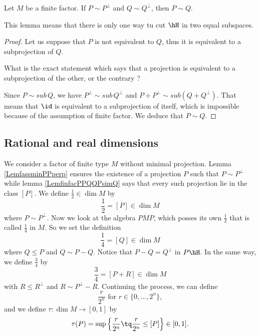 \begin{lemma}		\label{LemfinfacPPQQPsimQ}
Let $M$ be a finite factor. If $P\sim P^{\perp}$ and $Q\sim Q^{\perp}$, then $P\sim Q$.
\end{lemma}

This lemma means that there is only one way tu cut $\hH$ in two equal subspaces.

\begin{proof}
Let us suppose that $P$ is not equivalent to $Q$, thus it is equivalent to a subprojection of $Q$.

\begin{probleme}
What is the exact statement which says that a projection is equivalent to a subprojection of the other, or the contrary ?
\end{probleme}

Since $P\sim sub\, Q$, we have $P^{\perp}\sim sub\, Q^{\perp}$ and $P+P^{\perp}\sim sub(Q+Q^{\perp})$. That means that $\id$ is equivalent to a subprojection of itself, which is impossible because of the assumption of finite factor. We deduce that $P\sim Q$.
\end{proof}

					\subsection{Rational and real dimensions}
\label{SubSecRationalRealDim}

We consider a factor of finite type $M$ without minimal projection. Lemma \ref{LemfassminPPperp} ensures the existence of a projection $P$ such that $P\sim P^{\perp}$ while lemma \ref{LemfinfacPPQQPsimQ} says that every such projection lie in the class $[P]$. We define $\frac{ 1 }{2}\in\dim M$ by
\begin{equation}
\frac{ 1 }{2}=[P]\in\dim M
\end{equation}
where $P\sim P^{\perp}$. Now we look at the algebra $PMP$, which posses its own $\frac{ 1 }{2}$ that is called $\frac{1}{ 4 }$ in $M$. So we set the definition
\begin{equation}
	\frac{1}{ 4 }=[Q]\in\dim M
\end{equation}
where $Q\leq P$ and $Q\sim P-Q$. Notice that $P-Q=Q^{\perp}$ in $P\hH$. In the same way, we define $\frac{ 3 }{ 4 }$ by
\begin{equation}
	\frac{ 3 }{ 4 }=[P+R]\in\dim M
\end{equation}
with $R\leq R^{\perp}$ and $R\sim P^{\perp}-R$. Continuing the process, we can define
\[ 
	\frac{ r }{ 2^n }\text{ for } r\in\{ 0,\ldots, 2^n \},
\]
and we define $\tau\colon \dim M\to [0,1]$ by
\begin{equation}
	\tau(P)=\sup\Big\{ \frac{ r }{ 2^n }\tq \frac{ r }{ 2^n }\leq [P] \Big\}\in [0,1].
\end{equation}

